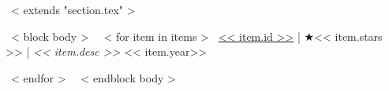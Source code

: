 ~< extends "section.tex" >~

~< block body >~
  ~< for item in items >~
    \href{<< item.repo_url >>}{<< item.id >>} | $\bigstar$<< item.stars >> |
    \emph{<< item.desc >>} \hfill
    << item.year>> \par
  ~< endfor >~
~< endblock body >~

